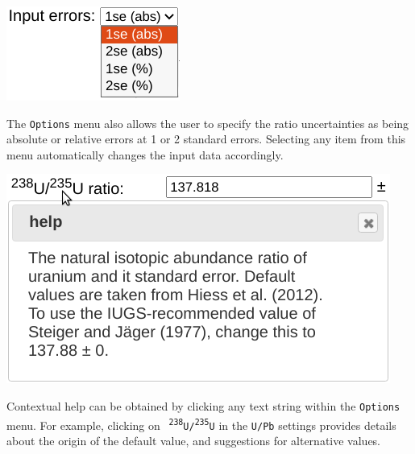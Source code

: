\begin{refsection}
\noindent\begin{minipage}[t]{.25\textwidth}
\strut\vspace*{-\baselineskip}\newline
\includegraphics[width=.85\textwidth]{../figures/ierr.png}
\end{minipage}
\begin{minipage}[t]{.75\textwidth}
The \texttt{Options} menu also allows the user to specify the ratio
uncertainties as being absolute or relative errors at 1 or 2 standard
errors. Selecting any item from this menu automatically changes the
input data accordingly.\\
\end{minipage}

\noindent\begin{minipage}[t]{.45\textwidth}
\strut\vspace*{-\baselineskip}\newline
\includegraphics[width=\textwidth]{../figures/contextualhelp.png}
\end{minipage}
\begin{minipage}[t]{.55\textwidth}
Contextual help can be obtained by clicking any text string within the
\texttt{Options} menu. For example, clicking on \textsuperscript{\tt
  238}\texttt{U/}\textsuperscript{\tt 235}\texttt{U} in the
\texttt{U/Pb} settings provides details about the origin of the
default value, and suggestions for alternative values.
\end{minipage}


\end{refsection}
